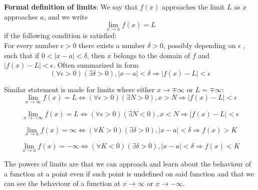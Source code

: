 \documentclass[12pt]{article}
\begin{document}
\textbf{Formal definition of limits}: We say that $f(x)$ approaches the limit $L$ as $x$ approaches $a$, and we write $$\lim \limits_{x \to a} f(x)=L$$ if the following condition is satisfied:\\
For every number $\epsilon > 0$ there exists a number $\delta > 0$, possibly depending on $\epsilon$ , such that if $0<|x-a|<\delta$, then $x$ belongs to the domain of $f$ and $|f(x)-L|<\epsilon$. Often summarized in form $$(\forall \epsilon > 0 )(\exists \delta > 0), |x-a|<\delta \Rightarrow |f(x)-L|<\epsilon$$

Similar statement is made for limits where either $x \to \mp \infty$ or $L= \mp \infty$: 
$$\lim \limits_{x \to \infty} f(x)=L \Leftrightarrow (\forall \epsilon > 0 )(\exists N > 0), x>N \Rightarrow |f(x)-L|<\epsilon$$

$$\lim \limits_{x \to -\infty} f(x)=L \Leftrightarrow (\forall \epsilon > 0 )(\exists N < 0), x<N \Rightarrow |f(x)-L|<\epsilon$$

$$\lim \limits_{x \to a} f(x)=\infty  \Leftrightarrow (\forall K>0 )(\exists \delta > 0), |x-a|<\delta \Rightarrow f(x)>K$$

$$\lim \limits_{x \to a} f(x)=-\infty  \Leftrightarrow (\forall K<0 )(\exists \delta > 0), |x-a|<\delta \Rightarrow f(x)<K$$

The powers of limits are that we can approach and learn about the behaviour of a function at a point even if such point is undefined on said function and that we can see the behaviour of a function at $x \to \infty$ or $x \to -\infty$.
\end{document}
